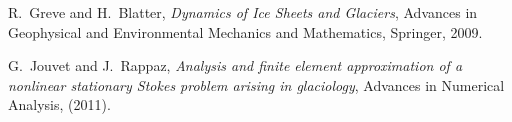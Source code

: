 \documentclass[letterpaper,final,12pt,reqno]{amsart}
\begin{document}
\begin{thebibliography}{4}
{\sc R.~Greve and H.~Blatter}, {\em Dynamics of {I}ce {S}heets and {G}laciers},
  Advances in Geophysical and Environmental Mechanics and Mathematics,
  Springer, 2009.

{\sc G.~Jouvet and J.~Rappaz}, {\em Analysis and finite element approximation
  of a nonlinear stationary {S}tokes problem arising in glaciology}, Advances
  in Numerical Analysis, (2011).


\end{thebibliography}
\end{document}
